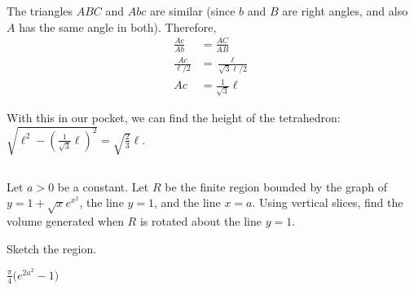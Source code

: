 \begin{solution}
The triangles $ABC$ and $Abc$ are similar (since $b$ and $B$ are right angles, and also $A$ has the same angle in both). Therefore,
\begin{align*}
\frac{{Ac}}{{Ab}}&=\frac{{AC}}{{AB}}\\
\frac{Ac}{\ell/2}&=\frac{\ell}{\sqrt{3}\ell/2}\\
Ac&=\frac{1}{\sqrt{3}}\ell
\end{align*}

With this in our pocket, we can find the height of the tetrahedron: $\sqrt{\ell^2 - \left(\frac{1}{\sqrt{3}}\ell\right)^2} =\sqrt{\frac{2}{3}}\ell$.


\end{solution}


\subsection*{\Procedural}

\begin{Mquestion}[2016Q3] %
Let $a>0$ be a constant. Let $R$ be the finite region bounded by the
graph of $y=1+\sqrt{x}e^{x^2}$, the line $y=1$, and the line $x=a$. Using
vertical slices, find the volume generated when $R$ is rotated about the line $y=1$.
\end{Mquestion}

\begin{hint}
Sketch the region.
\end{hint}

\begin{answer}
$\displaystyle\frac{\pi}{4}\Big(e^{2a^2}-1\Big)$
\end{answer}

